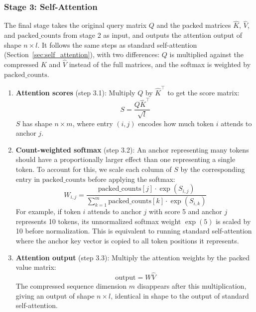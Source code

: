 \subsubsection{Stage 3: Self-Attention}
\label{sec:self_attention_compressed}

The final stage takes the original query matrix $Q$ and the packed matrices $\hat{K}$, $\hat{V}$, and $\text{packed\_counts}$ from stage 2 as input, and outputs the attention output of shape $n \times l$. It follows the same steps as standard self-attention (Section~\ref{sec:self_attention}), with two differences: $Q$ is multiplied against the compressed $\hat{K}$ and $\hat{V}$ instead of the full matrices, and the softmax is weighted by $\text{packed\_counts}$.

\begin{enumerate}
    \item \textbf{Attention scores} (step 3.1): Multiply $Q$ by $\hat{K}^\top$ to get the score matrix:
    \begin{equation}
        S = \frac{Q\hat{K}^\top}{\sqrt{l}}
    \end{equation}
    $S$ has shape $n \times m$, where entry $(i, j)$ encodes how much token $i$ attends to anchor $j$.

    \item \textbf{Count-weighted softmax} (step 3.2): An anchor representing many tokens should have a proportionally larger effect than one representing a single token. To account for this, we scale each column of $S$ by the corresponding entry in $\text{packed\_counts}$ before applying the softmax:
    \begin{equation}
        \label{eq:count_weighted_softmax}
        W_{i,j} = \frac{\text{packed\_counts}[j] \cdot \exp(S_{i,j})}{\displaystyle\sum_{k=1}^{m} \text{packed\_counts}[k] \cdot \exp(S_{i,k})}
    \end{equation}
    For example, if token $i$ attends to anchor $j$ with score 5 and anchor $j$ represents 10 tokens, its unnormalized softmax weight $\exp(5)$ is scaled by 10 before normalization. This is equivalent to running standard self-attention where the anchor key vector is copied to all token positions it represents.

    \item \textbf{Attention output} (step 3.3): Multiply the attention weights by the packed value matrix:
    \begin{equation}
        \text{output} = W\hat{V}
    \end{equation}
    The compressed sequence dimension $m$ disappears after this multiplication, giving an output of shape $n \times l$, identical in shape to the output of standard self-attention.
\end{enumerate}

